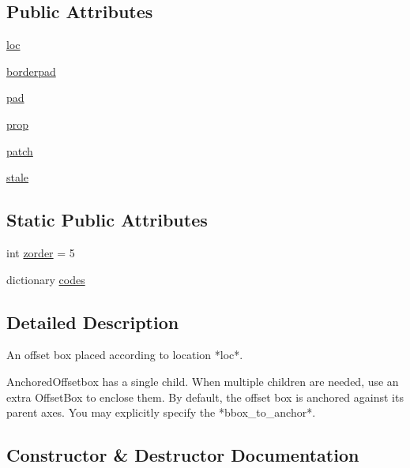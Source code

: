 \subsection*{Public Attributes}
\begin{DoxyCompactItemize}
\item 
\hyperlink{classmatplotlib_1_1offsetbox_1_1AnchoredOffsetbox_acff8512cc529c0576658d3d3102f68ad}{loc}
\item 
\hyperlink{classmatplotlib_1_1offsetbox_1_1AnchoredOffsetbox_a50d24143d0fabb11a481b3d85b62a19a}{borderpad}
\item 
\hyperlink{classmatplotlib_1_1offsetbox_1_1AnchoredOffsetbox_a31d7295c4ca96c77f4bd5695fe094357}{pad}
\item 
\hyperlink{classmatplotlib_1_1offsetbox_1_1AnchoredOffsetbox_aa66f860ff37b423d0cd90d61605702ef}{prop}
\item 
\hyperlink{classmatplotlib_1_1offsetbox_1_1AnchoredOffsetbox_a80c01e8c1245fda04e52b1eb009e9637}{patch}
\item 
\hyperlink{classmatplotlib_1_1offsetbox_1_1AnchoredOffsetbox_aee29ac50a2db37d637c2d6af0206aab5}{stale}
\end{DoxyCompactItemize}
\subsection*{Static Public Attributes}
\begin{DoxyCompactItemize}
\item 
int \hyperlink{classmatplotlib_1_1offsetbox_1_1AnchoredOffsetbox_ac4ddd379ba84648d93746f29c34c6a29}{zorder} = 5
\item 
dictionary \hyperlink{classmatplotlib_1_1offsetbox_1_1AnchoredOffsetbox_aa6c645f3d6dbb09a0a7ef1229f9f060f}{codes}
\end{DoxyCompactItemize}


\subsection{Detailed Description}
\begin{DoxyVerb}An offset box placed according to location *loc*.

AnchoredOffsetbox has a single child.  When multiple children are needed,
use an extra OffsetBox to enclose them.  By default, the offset box is
anchored against its parent axes. You may explicitly specify the
*bbox_to_anchor*.
\end{DoxyVerb}
 

\subsection{Constructor \& Destructor Documentation}
\mbox{\label{classmatplotlib_1_1offsetbox_1_1AnchoredOffsetbox_ad90b11188ace543612a1d75702560034}} 
